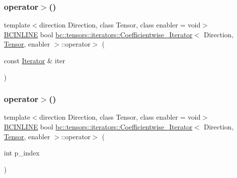 \mbox{\label{structbc_1_1tensors_1_1iterators_1_1Coefficientwise__Iterator_abc7a6543da031f9748a774966557ae0d}} 
\subsubsection{\texorpdfstring{operator$>$()}{operator>()}\hspace{0.1cm}{\footnotesize\ttfamily [1/2]}}
{\footnotesize\ttfamily template$<$direction Direction, class Tensor, class enabler = void$>$ \\
\hyperlink{common_8h_a6699e8b0449da5c0fafb878e59c1d4b1}{B\+C\+I\+N\+L\+I\+NE} bool \hyperlink{structbc_1_1tensors_1_1iterators_1_1Coefficientwise__Iterator}{bc\+::tensors\+::iterators\+::\+Coefficientwise\+\_\+\+Iterator}$<$ Direction, \hyperlink{namespacebc_a659391e47ab612be3ba6c18cf9c89159}{Tensor}, enabler $>$\+::operator$>$ (\begin{DoxyParamCaption}\item[{const \hyperlink{structbc_1_1tensors_1_1iterators_1_1Coefficientwise__Iterator_a313f76f47e60a806035279a36a84f835}{Iterator} \&}]{iter }\end{DoxyParamCaption})\hspace{0.3cm}{\ttfamily [inline]}}

\mbox{\label{structbc_1_1tensors_1_1iterators_1_1Coefficientwise__Iterator_a22b4586524af2b25fae962b9e3c26e72}} 
\subsubsection{\texorpdfstring{operator$>$()}{operator>()}\hspace{0.1cm}{\footnotesize\ttfamily [2/2]}}
{\footnotesize\ttfamily template$<$direction Direction, class Tensor, class enabler = void$>$ \\
\hyperlink{common_8h_a6699e8b0449da5c0fafb878e59c1d4b1}{B\+C\+I\+N\+L\+I\+NE} bool \hyperlink{structbc_1_1tensors_1_1iterators_1_1Coefficientwise__Iterator}{bc\+::tensors\+::iterators\+::\+Coefficientwise\+\_\+\+Iterator}$<$ Direction, \hyperlink{namespacebc_a659391e47ab612be3ba6c18cf9c89159}{Tensor}, enabler $>$\+::operator$>$ (\begin{DoxyParamCaption}\item[{int}]{p\+\_\+index }\end{DoxyParamCaption})\hspace{0.3cm}{\ttfamily [inline]}}

